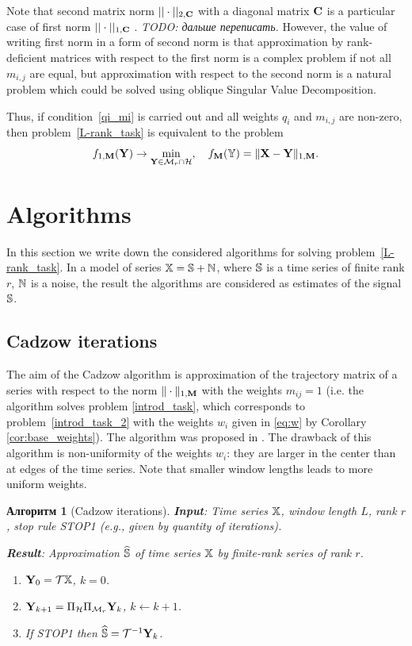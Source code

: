 \documentclass[12pt,a4paper,fleqn,leqno]{article}
\newtheorem{algorithm}{Алгоритм}
\begin{document}
Note that second matrix norm $||\cdot||_{2, \mathbf{C}}$ with a diagonal matrix $\mathbf{C}$ is a particular case of first norm $||\cdot||_{1, \mathbf{C}}$ . \emph{TODO: дальше переписать.} However, the value of writing first norm in a form of second norm is that approximation by rank-deficient matrices with respect to the first norm is a complex problem if not all $m_{i,j}$ are equal, but approximation with respect to the second norm is a natural problem which could be solved using oblique Singular Value Decomposition.

\begin{remark}
\label{rem:2tasks}
Thus, if condition~\eqref{qi_mi} is carried out and all weights $q_i$ and $m_{i,j}$ are non-zero, then problem~\eqref{L-rank_task}
is equivalent to the problem
\begin{equation}
\label{rank_task}
    f_{1,\mathbf{M}}(\mathbf{Y}) \to \min_{\mathbf{Y} \in \mathcal{M}_r \cap \mathcal{H}}, \quad f_{\mathbf{M}}(\mathbb{Y}) = \|\mathbf{X}-\mathbf{Y}\|_{1,\mathbf{M}}.
\end{equation}
\end{remark}

\section{Algorithms}
\label{sec:alg}
In this section we write down the considered algorithms for solving problem~\eqref{L-rank_task}.
In a model of series $\mathbb{X}=\mathbb{S}+\mathbb{N}$, where $\mathbb{S}$ is a time series of finite rank $r$, $\mathbb{N}$ is a noise, the result the algorithms are considered as estimates of the signal $\mathbb{S}$.

\subsection{Cadzow iterations}
The aim of the Cadzow algorithm is approximation of the trajectory matrix of a series with respect to the norm $\|\cdot\|_{1, \mathbf{M}}$ with the weights $m_{ij}=1$ (i.e. the algorithm solves problem \eqref{introd_task}, which corresponds to problem~\eqref{introd_task_2} with the weights $w_i$ given in \eqref{eq:w} by Corollary \ref{cor:base_weights}). The algorithm was proposed in \cite{Cadzow1988}. The drawback of this algorithm is non-uniformity of the weights $w_i$: they are larger in the center than at edges of the time series. Note that smaller window lengths leads to more uniform weights.
	
\begin{algorithm}[Cadzow iterations]
\textbf{Input}: Time series $\mathbb{X}$, window length $L$, rank $r$,
stop rule STOP1 (e.g., given by quantity of iterations).

\textbf{Result}:
Approximation $\widehat{\mathbb{S}}$ of time series $\mathbb{X}$ by finite-rank series of rank $r$.

\begin{enumerate}
\item
$\mathbf{Y}_0 = \mathcal{T} \mathbb{X}$, $k=0$.
\item
$\mathbf{Y}_{k+1} = \Pi_{\mathcal{H}}  \Pi_{\mathcal{M}_r} \mathbf{Y}_{k}$, $k\leftarrow k+1$.
\item
If STOP1 then $\widehat{\mathbb{S}} = \mathcal{T}^{-1} \mathbf{Y}_k$.
\end{enumerate}
\end{algorithm}
\end{document}
